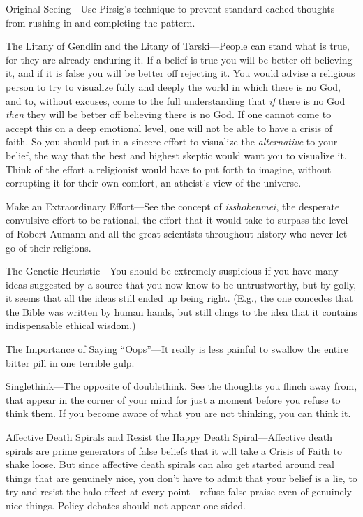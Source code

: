 {
 Original Seeing---Use Pirsig's technique to
prevent standard cached thoughts from rushing in and completing the
pattern.}

{
 The Litany of Gendlin and the Litany of Tarski---People can stand
what is true, for they are already enduring it. If a belief is true you
will be better off believing it, and if it is false you will be better
off rejecting it. You would advise a religious person to try to
visualize fully and deeply the world in which there is no God, and to,
without excuses, come to the full understanding that \textit{if} there
is no God \textit{then} they will be better off believing there is no
God. If one cannot come to accept this on a deep emotional level, one
will not be able to have a crisis of faith. So you should put in a
sincere effort to visualize the \textit{alternative} to your belief,
the way that the best and highest skeptic would want you to visualize
it. Think of the effort a religionist would have to put forth to
imagine, without corrupting it for their own comfort, an
atheist's view of the universe.}

{
 Make an Extraordinary Effort---See the concept of
\textit{isshokenmei}, the desperate convulsive effort to be rational,
the effort that it would take to surpass the level of Robert Aumann and
all the great scientists throughout history who never let go of their
religions.}

{
 The Genetic Heuristic---You should be extremely suspicious if you
have many ideas suggested by a source that you now know to be
untrustworthy, but by golly, it seems that all the ideas still ended up
being right. (E.g., the one concedes that the Bible was written by
human hands, but still clings to the idea that it contains
indispensable ethical wisdom.)}

{
 The Importance of Saying
``Oops''---It really is less painful
to swallow the entire bitter pill in one terrible gulp.}

{
 Singlethink---The opposite of doublethink. See the thoughts you
flinch away from, that appear in the corner of your mind for just a
moment before you refuse to think them. If you become aware of what you
are not thinking, you can think it.}

{
 Affective Death Spirals and Resist the Happy Death
Spiral---Affective death spirals are prime generators of false beliefs
that it will take a Crisis of Faith to shake loose. But since affective
death spirals can also get started around real things that are
genuinely nice, you don't have to admit that your
belief is a lie, to try and resist the halo effect at every
point---refuse false praise even of genuinely nice things. Policy
debates should not appear one-sided.}

